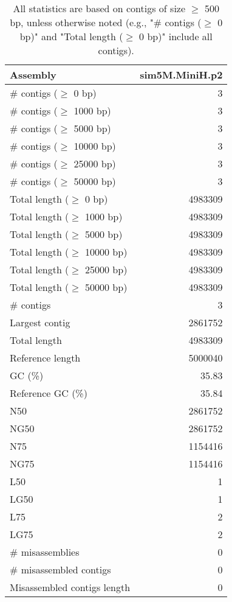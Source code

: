 \documentclass[12pt,a4paper]{article}
\begin{document}
\begin{table}[ht]
\begin{center}
\caption{All statistics are based on contigs of size $\geq$ 500 bp, unless otherwise noted (e.g., "\# contigs ($\geq$ 0 bp)" and "Total length ($\geq$ 0 bp)" include all contigs).}
\begin{tabular}{|l*{1}{|r}|}
\hline
Assembly & sim5M.MiniH.p2 \\ \hline
\# contigs ($\geq$ 0 bp) & 3 \\ \hline
\# contigs ($\geq$ 1000 bp) & 3 \\ \hline
\# contigs ($\geq$ 5000 bp) & 3 \\ \hline
\# contigs ($\geq$ 10000 bp) & 3 \\ \hline
\# contigs ($\geq$ 25000 bp) & 3 \\ \hline
\# contigs ($\geq$ 50000 bp) & 3 \\ \hline
Total length ($\geq$ 0 bp) & 4983309 \\ \hline
Total length ($\geq$ 1000 bp) & 4983309 \\ \hline
Total length ($\geq$ 5000 bp) & 4983309 \\ \hline
Total length ($\geq$ 10000 bp) & 4983309 \\ \hline
Total length ($\geq$ 25000 bp) & 4983309 \\ \hline
Total length ($\geq$ 50000 bp) & 4983309 \\ \hline
\# contigs & 3 \\ \hline
Largest contig & 2861752 \\ \hline
Total length & 4983309 \\ \hline
Reference length & 5000040 \\ \hline
GC (\%) & 35.83 \\ \hline
Reference GC (\%) & 35.84 \\ \hline
N50 & 2861752 \\ \hline
NG50 & 2861752 \\ \hline
N75 & 1154416 \\ \hline
NG75 & 1154416 \\ \hline
L50 & 1 \\ \hline
LG50 & 1 \\ \hline
L75 & 2 \\ \hline
LG75 & 2 \\ \hline
\# misassemblies & 0 \\ \hline
\# misassembled contigs & 0 \\ \hline
Misassembled contigs length & 0 \\ \hline

\end{tabular}
\end{center}
\end{table}
\end{document}
